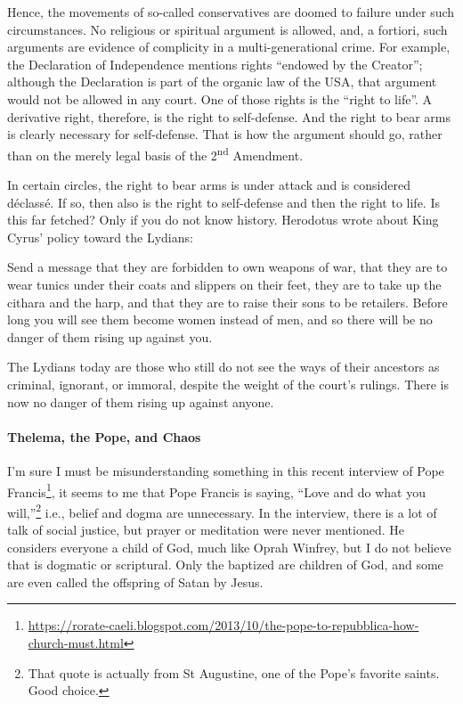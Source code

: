 Hence, the movements of so-called conservatives are doomed to failure under such circumstances. No religious or spiritual argument is allowed, and, a fortiori, such arguments are evidence of complicity in a multi-generational crime. For example, the Declaration of Independence mentions rights ``endowed by the Creator''; although the Declaration is part of the organic law of the USA, that argument would not be allowed in any court. One of those rights is the ``right to life''. A derivative right, therefore, is the right to self-defense. And the right to bear arms is clearly necessary for self-defense. That is how the argument should go, rather than on the merely legal basis of the 2\textsuperscript{nd} Amendment.

In certain circles, the right to bear arms is under attack and is considered déclassé. If so, then also is the right to self-defense and then the right to life. Is this far fetched? Only if you do not know history. Herodotus wrote about King Cyrus' policy toward the Lydians:

\begin{quotex}
Send a message that they are forbidden to own weapons of war, that they are to wear tunics under their coats and slippers on their feet, they are to take up the cithara and the harp, and that they are to raise their sons to be retailers. Before long you will see them become women instead of men, and so there will be no danger of them rising up against you.
\end{quotex}


The Lydians today are those who still do not see the ways of their ancestors as criminal, ignorant, or immoral, despite the weight of the court's rulings. There is now no danger of them rising up against anyone.

\paragraph{Thelema, the Pope, and Chaos}


I'm sure I must be misunderstanding something in this recent interview of Pope Francis\footnote{\url{https://rorate-caeli.blogspot.com/2013/10/the-pope-to-repubblica-how-church-must.html}}, it seems to me that Pope Francis is saying, ``Love and do what you will,''\footnote{That quote is actually from St Augustine, one of the Pope's favorite saints. Good choice.} i.e., belief and dogma are unnecessary. In the interview, there is a lot of talk of social justice, but prayer or meditation were never mentioned. He considers everyone a child of God, much like Oprah Winfrey, but I do not believe that is dogmatic or scriptural. Only the baptized are children of God, and some are even called the offspring of Satan by Jesus.

